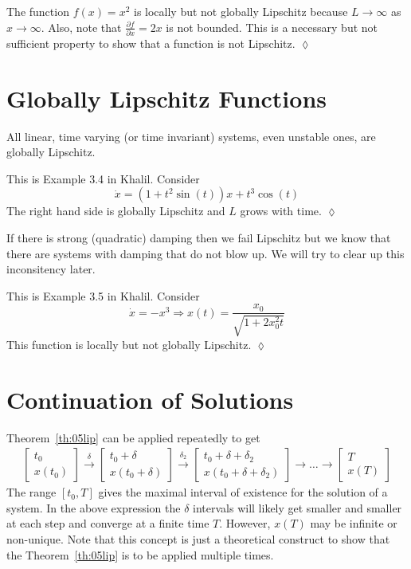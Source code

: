 \begin{example}
The function $f(x) = x^2$ is locally but not globally Lipschitz because $L\to\infty$ as $x\to\infty$.
Also, note that $\frac{\partial f}{\partial x} = 2x$ is not bounded.
This is a necessary but not sufficient property to show that a function is not Lipschitz.
$\lozenge$
\end{example}

\section{Globally Lipschitz Functions}
All linear, time varying (or time invariant) systems, even unstable ones, are globally Lipschitz.

\begin{example}
This is Example 3.4 in Khalil.
Consider
$$\dot{x} = (1+t^2\sin(t))x + t^3\cos(t)$$
The right hand side is globally Lipschitz and $L$ grows with time.
$\lozenge$
\end{example}

If there is strong (quadratic) damping then we fail Lipschitz but we know that there are systems with damping that do not blow up.
We will try to clear up this inconsitency later.

\begin{example}
This is Example 3.5 in Khalil.
Consider
$$\dot{x} = -x^3 \Rightarrow x(t) = \frac{x_0}{\sqrt{1+2x_0^2t}}$$
This function is locally but not globally Lipschitz.
$\lozenge$
\end{example}

\section{Continuation of Solutions}
Theorem~\ref{th:05lip} can be applied repeatedly to get
\begin{align*}
\left[\begin{array}{c} t_0 \\ x(t_0) \end{array}\right] \xrightarrow{\delta}
\left[\begin{array}{c} t_0+\delta \\ x(t_0+\delta) \end{array}\right] \xrightarrow{\delta_2}
\left[\begin{array}{c} t_0+\delta+\delta_2 \\ x(t_0+\delta+\delta_2) \end{array}\right] \rightarrow{}
\ldots \rightarrow{}
\left[\begin{array}{c} T \\ x(T) \end{array}\right]
\end{align*}
The range $[t_0, T]$ gives the maximal interval of existence for the solution of a system.
In the above expression the $\delta$ intervals will likely get smaller and smaller at each step and converge at a finite time $T$.
However, $x(T)$ may be infinite or non-unique.
Note that this concept is just a theoretical construct to show that the Theorem~\ref{th:05lip} is to be applied multiple times.

